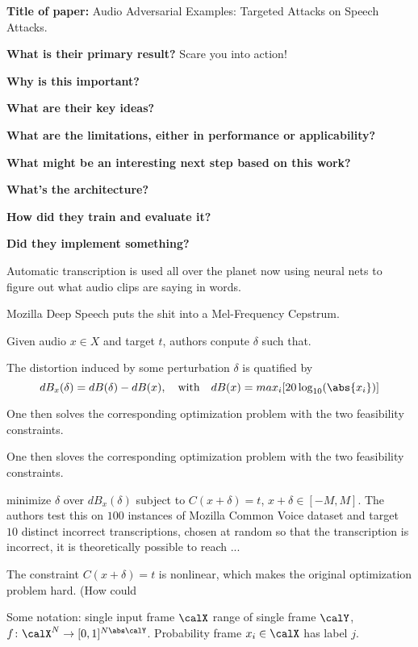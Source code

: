 \noindent \textbf{\large Title of paper:} Audio Adversarial Examples: Targeted
Attacks on Speech Attacks.

\noindent\textbf{\large What is their primary result?} Scare you into action!

\noindent\textbf{\large Why is this important?}

\noindent\textbf{\large What are their key ideas?}

\noindent\textbf{\large What are the limitations, either in performance or applicability?}

\noindent\textbf{\large What might be an interesting next step based on this work?}

\noindent\textbf{\large What's the architecture?}

\noindent\textbf{\large How did they train and evaluate it?}

\noindent\textbf{\large Did they implement something?}


Automatic transcription is used all over the planet now using neural nets to
figure out what audio clips are saying in words.

Mozilla Deep Speech puts the shit into a Mel-Frequency Cepstrum.

Given audio $x\in X$ and target $t$, authors conpute $\delta$ such that.

The distortion induced by some perturbation $\delta$ is quatified by
\[
  dB_x(\delta)=dB(\delta)-dB(x),\quad \text{with}\quad
  dB(x)=max_i [20\log_{10}(\abs{x_i})]
\]

One then solves the corresponding optimization problem with the two feasibility
constraints.

One then sloves the corresponding optimization problem with the two feasibility
constraints.

minimize $\delta$ over $dB_x(\delta)$ subject to $C(x+\delta)=t$,
$x+\delta\in[-M,M]$. The authors test this on $100$ instances of Mozilla Common
Voice dataset and target $10$ distinct incorrect transcriptions, chosen at
random so that the transcription is incorrect, it is theoretically possible to
reach ...

The constraint $C(x+\delta)=t$ is nonlinear, which makes the original
optimization problem hard. (How could

Some notation: single input frame $\calX$ range of single frame $\calY$,
$f\colon\calX^N\to[0,1]^{N\abs\calY}$. Probability frame $x_i\in\calX$ has label
$j$.

